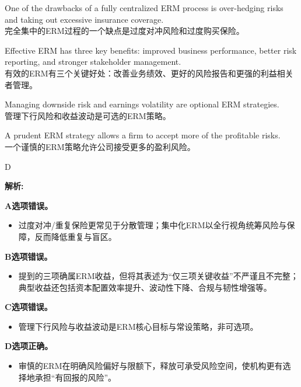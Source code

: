 \documentclass{article}
\newenvironment{explanation}
{\textbf{解析:}\par}
{\par}
\begin{document}
\begin{choices}
    \item One of the drawbacks of a fully centralized ERM process is over-hedging risks and taking out excessive insurance coverage.
    \\完全集中的ERM过程的一个缺点是过度对冲风险和过度购买保险。
    \item Effective ERM has three key benefits: improved business performance, better risk reporting, and stronger stakeholder management.
    \\有效的ERM有三个关键好处：改善业务绩效、更好的风险报告和更强的利益相关者管理。
    \item Managing downside risk and earnings volatility are optional ERM strategies.
    \\管理下行风险和收益波动是可选的ERM策略。
    \item A prudent ERM strategy allows a firm to accept more of the profitable risks.
    \\一个谨慎的ERM策略允许公司接受更多的盈利风险。
\end{choices}

\begin{correctanswer}
    D
\end{correctanswer}

\begin{explanation}
    \textbf{A选项错误。}
    \begin{itemize}
        \item 过度对冲/重复保险更常见于分散管理；集中化ERM以全行视角统筹风险与保障，反而降低重复与盲区。
    \end{itemize}

    \textbf{B选项错误。}
    \begin{itemize}
        \item 提到的三项确属ERM收益，但将其表述为“仅三项关键收益”不严谨且不完整；典型收益还包括资本配置效率提升、波动性下降、合规与韧性增强等。
    \end{itemize}

    \textbf{C选项错误。}
    \begin{itemize}
        \item 管理下行风险与收益波动是ERM核心目标与常设策略，非可选项。
    \end{itemize}

    \textbf{D选项正确。}
    \begin{itemize}
        \item 审慎的ERM在明确风险偏好与限额下，释放可承受风险空间，使机构更有选择地承担“有回报的风险”。
    \end{itemize}
\end{explanation}
\end{document}
